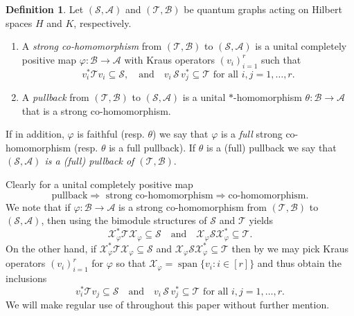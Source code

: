 \documentclass[11pt]{amsart}
\numberwithin{equation}{section}
\theoremstyle{plain}
\theoremstyle{definition}
\newtheorem{definition}[theorem]{Definition}
\theoremstyle{remark}
\newcommand{\A}{{\mathcal{A}}}
\newcommand{\B}{{\mathcal{B}}}
\renewcommand{\S}{{\mathcal{S}}}
\newcommand{\T}{{\mathcal{T}}}
\newcommand{\X}{{\mathcal{X}}}
\newcommand\vphi{\varphi}
\newcommand{\foral}{\text{ for all }}
\newcommand{\qand}{\quad\text{and}\quad}
\newcommand{\spn}{\operatorname{span}}
\begin{document}
\begin{definition} \label{D:pullbackmap}
Let $(\S,\A)$ and $(\T, \B)$ be quantum graphs acting on  Hilbert spaces $H$ and $K$, respectively. 
\begin{enumerate}
\item A  \emph{strong co-homomorphism} from $ (\T,\B)$ to $ (\S,\A)$  is a unital completely positive map $\vphi \colon \B \to \A$ with Kraus operators $(v_i)_{i=1}^r$ such that 
\[
v_i^*\T v_i \subseteq \S, \qand
v_i\,\S\,v_j^* \subseteq \T
\foral i,j=1,\dots,r.
\]
\item A \emph{pullback} from $ (\T,\B)$ to $ (\S,\A)$ is a unital $*$-homomorphism $\theta : \B \to \A$  that is a strong co-homomorphism.
\end{enumerate}
If in addition, $\vphi$ is faithful (resp. $\theta$)
we say that $\vphi$  is a \emph{full} strong co-homomorphism (resp. $\theta$ is a  full pullback). 
If $\theta$ is a (full) pullback we say that \emph{$(\S,\A)$ is a (full) pullback of $(\T,\B)$}.
\end{definition}
Clearly for a unital completely positive map
\[
\text{pullback} \Rightarrow \text{ strong co-homomorphism} \Rightarrow \text{co-homomorphism}.
\]
We note that if $ \vphi \colon \B \to \A$ is a strong co-homomorphism from $ (\T,\B)$ to $ (\S,\A)$, then using the bimodule structures of $\S$ and $\T$ yields
\[
\X_{\vphi}^*\T \X_{\vphi} \subseteq \S \qand  \X_{\vphi} \S \X_{\vphi}^* \subseteq \T.
\]
On the other hand, if $ \X_{\vphi}^*\T \X_{\vphi} \subseteq \S$ and $ \X_{\vphi} \S \X_{\vphi}^* \subseteq \T$ then  by \cite[Proposition 6.1]{KL26} we may pick Kraus operators $(v_i)_{i=1}^r$ for $\vphi$ so that $\X_{\vphi} = \spn\{v_i:i\in [r]\}$ and thus obtain the inclusions
\[
v_i^*\T v_j \subseteq \S \qand v_i\,\S\,v_j^* \subseteq \T
\foral i,j=1,\dots,r.
\]
We will make regular use of \cite[Proposition 6.1]{KL26} throughout this paper without further mention.

\medskip
\end{document}
